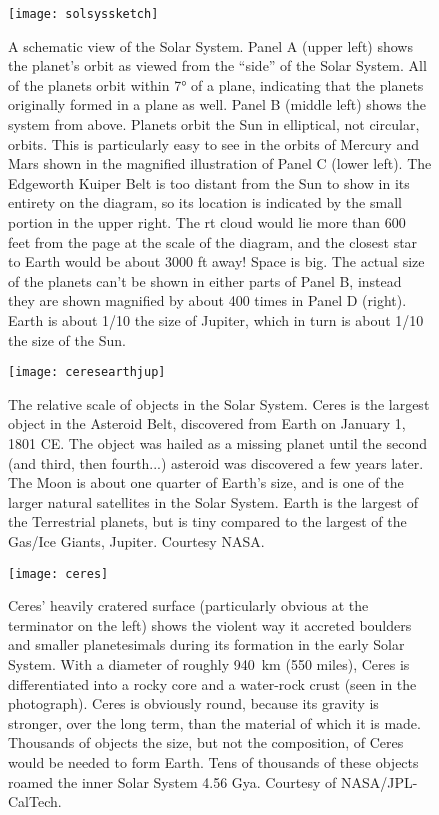 \begin{figure}[p]
\centering
\texttt{[image: solsyssketch]}%
\caption{A schematic view of the Solar System. Panel A (upper left) shows the planet's orbit as viewed from the ``side'' of the Solar System. All of the planets orbit within \ang{7} of a plane, indicating that the planets originally formed in a plane as well. Panel B (middle left) shows the system from above. Planets orbit the Sun in elliptical, not circular, orbits. This is particularly easy to see in the orbits of Mercury and Mars shown in the magnified illustration of Panel C (lower left). The Edgeworth Kuiper Belt is too distant from the Sun to show in its entirety on the diagram, so its location is indicated by the small portion in the upper right. The rt cloud would lie more than 600 feet from the page at the scale of the diagram, and the closest star to Earth would be about 3000 ft away! Space is big. The actual size of the planets can't be shown in either parts of Panel B, instead they are shown magnified by about 400 times in Panel D (right). Earth is about 1/10 the size of Jupiter, which in turn is about 1/10 the size of the Sun.}   
\label{fig:solsys2}
\end{figure}
 
\begin{figure}[p]
\centering
\texttt{[image: ceresearthjup]}%
\caption{The relative scale of objects in the Solar System. Ceres is the largest object in the Asteroid Belt, discovered from Earth on January 1, 1801 CE. The object was hailed as a missing planet until the second (and third, then fourth...) asteroid was discovered a few years later. The Moon is about one quarter of Earth's size, and is one of the larger natural satellites in the Solar System. Earth is the largest of the Terrestrial planets, but is tiny compared to the largest of the Gas/Ice Giants, Jupiter. Courtesy NASA.}   
\label{fig:sizes}
\end{figure}

\begin{figure}[p]
\centering
\texttt{[image: ceres]}%
\caption{Ceres' heavily cratered surface (particularly obvious at the terminator on the left) shows the violent way it accreted boulders and smaller planetesimals during its formation in the early Solar System. With a diameter of roughly \SI{940}{\kilo\metre} (550 miles), Ceres is differentiated into a rocky core and a water-rock crust (seen in the photograph). Ceres is obviously round, because its gravity is stronger, over the long term, than the material of which it is made. Thousands of objects the size, but not the composition, of Ceres would be needed to form Earth. Tens of thousands of these objects roamed the inner Solar System 4.56 Gya. Courtesy of NASA/JPL-CalTech.}   
\label{fig:ceres}
\end{figure}

